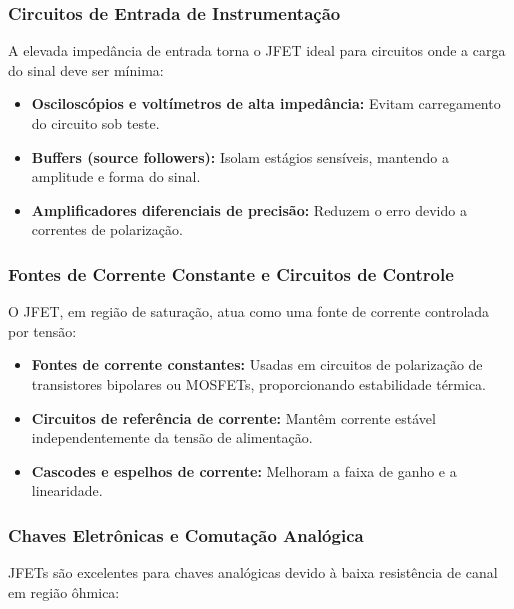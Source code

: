 \documentclass[12pt]{article}
\begin{document}
\subsubsection{Circuitos de Entrada de Instrumentação}

A elevada impedância de entrada torna o JFET ideal para circuitos onde a carga do sinal deve ser mínima:

\begin{itemize}
    \item \textbf{Osciloscópios e voltímetros de alta impedância:} Evitam carregamento do circuito sob teste.
    
    \item \textbf{Buffers (source followers):} Isolam estágios sensíveis, mantendo a amplitude e forma do sinal.
    
    \item \textbf{Amplificadores diferenciais de precisão:} Reduzem o erro devido a correntes de polarização.
\end{itemize}

\subsubsection{Fontes de Corrente Constante e Circuitos de Controle}

O JFET, em região de saturação, atua como uma fonte de corrente controlada por tensão:

\begin{itemize}
    \item \textbf{Fontes de corrente constantes:} Usadas em circuitos de polarização de transistores bipolares ou MOSFETs, proporcionando estabilidade térmica.
    
    \item \textbf{Circuitos de referência de corrente:} Mantêm corrente estável independentemente da tensão de alimentação.
    
    \item \textbf{Cascodes e espelhos de corrente:} Melhoram a faixa de ganho e a linearidade.
\end{itemize}

\subsubsection{Chaves Eletrônicas e Comutação Analógica}

JFETs são excelentes para chaves analógicas devido à baixa resistência de canal em região ôhmica:
\end{document}
